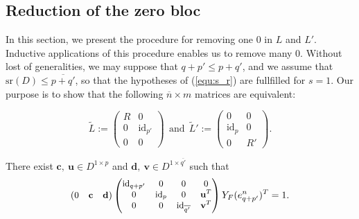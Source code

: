 \documentclass{ifacconf}
\newcommand\g[1]{\textbf{#1}}
\newcommand\id[1]{\text{id}_{#1}}
\newcommand\sr{\text{sr}(D)}
\begin{document}
\subsection{Reduction of the zero bloc}

In this section, we present the procedure for removing one $0$ in $L$ and
$L'$. Inductive applications of this procedure enables us to remove many
$0$. Without lost of generalities, we may suppose that $q+p'\leq p+q'$,
and we assume that $\sr\leq\overline{p+q'}$, so that the hypotheses of
(\ref{equ:s_r}) are fullfilled for $s=1$. Our purpose is to show that the
following $\overline{n}\times m$ matrices are equivalent:
\medskip
\begin{small}
  \[\tilde{L}:=\begin{pmatrix}
  R & 0\\
  0 & \id{p'}\\
  0 & 0
  \end{pmatrix}\ \ \text{and}\ \
  \tilde{L}':=\begin{pmatrix}
  0 & 0\\
  \id{p} & 0\\
  0 & R'
  \end{pmatrix}.\]
\end{small}

\smallskip

\begin{prop}\label{prop:reduced_Bezout_zero_part}
  There exist $\g{c},\ \g{u}\in D^{1\times p}$ and
  $\g{d},\ \g{v}\in D^{1\times\overline{q'}}$ such that
  \medskip
  \begin{equation}\label{equ:reduced_Bezout_zero_part}
    \begin{small}
      \begin{pmatrix}
        0 & \g{c} & \g{d}\end{pmatrix}\begin{pmatrix}
        \id{q+p'} & 0 & 0 & 0\\
        0 & \id{p} & 0 & \g{u}^T\\
        0 & 0 & \id{\overline{q'}} & \g{v}^T
      \end{pmatrix}Y_F(e^{n}_{q+p'})^T=1.
    \end{small}
  \end{equation}

\end{prop}
\end{document}

